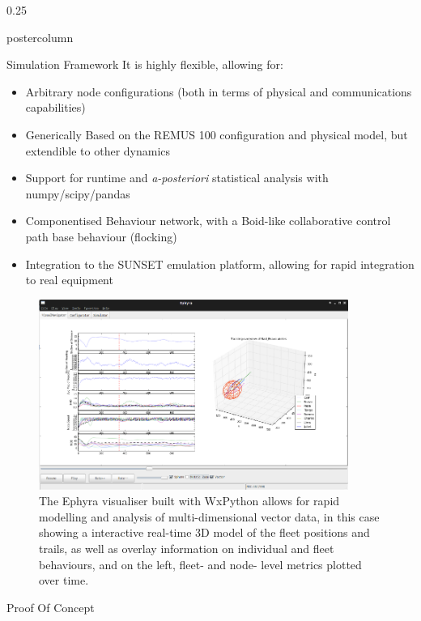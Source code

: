 \documentclass[final,hyperref={pdfpagelabels=false}]{beamer}
\def\colwidth{0.25\linewidth}
\begin{document}
\begin{frame}[fragile]
\begin{columns}[t]
\begin{column}{\colwidth}
\begin{beamercolorbox}[center,wd=\textwidth]{postercolumn}
\begin{minipage}[T]{.98\textwidth}
{\begin{block}{Simulation Framework}
              It is highly flexible, allowing for:
              \begin{itemize}
                \item Arbitrary node configurations (both in terms of physical and communications capabilities)
                \item Generically Based on the REMUS 100 configuration and physical model, but extendible to other dynamics
                \item Support for runtime and \emph{a-posteriori} statistical analysis with numpy/scipy/pandas
                \item Componentised Behaviour network, with a Boid-like collaborative control path base behaviour (flocking)
                \item Integration to the SUNSET emulation platform, allowing for rapid integration to real equipment
              \end{itemize}
              \vspace{\lineskip}
              \begin{figure}
                \includegraphics[width=0.9\textwidth]{figures/ephyra_vis}
                \caption{The Ephyra visualiser built with WxPython allows for rapid modelling and analysis of multi-dimensional vector data, in this case showing a interactive real-time 3D model of the fleet positions and trails, as well as overlay information on individual and fleet behaviours, and on the left, fleet- and node- level metrics plotted over time.}
                \label{fig:Ephyra}
              \end{figure}
            \end{block}     
             \begin{block}{Proof Of Concept}
              \begin{itemize}

\end{itemize}
\end{block}}
\end{minipage}
\end{beamercolorbox}
\end{column}
\end{columns}
\end{frame}
\end{document}
